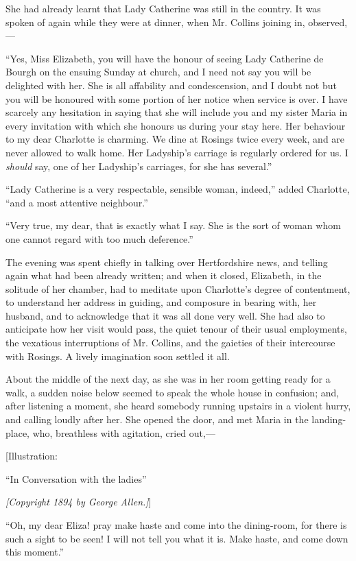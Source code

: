 \documentclass[12pt]{book}
\begin{document}
She had already learnt that Lady Catherine was still in the country. It was spoken of again while they were at dinner, when Mr. Collins joining in, observed,---

``Yes, Miss Elizabeth, you will have the honour of seeing Lady Catherine de Bourgh on the ensuing Sunday at church, and I need not say you will be delighted with her. She is all affability and condescension, and I doubt not but you will be honoured with some portion of her notice when service is over. I have scarcely any hesitation in saying that she will include you and my sister Maria in every invitation with which she honours us during your stay here. Her behaviour to my dear Charlotte is charming. We dine at Rosings twice every week, and are never allowed to walk home. Her Ladyship's carriage is regularly ordered for us. I \textit{should} say, one of her Ladyship's carriages, for she has several.''

``Lady Catherine is a very respectable, sensible woman, indeed,'' added Charlotte, ``and a most attentive neighbour.''

``Very true, my dear, that is exactly what I say. She is the sort of woman whom one cannot regard with too much deference.''

The evening was spent chiefly in talking over Hertfordshire news, and telling again what had been already written; and when it closed, Elizabeth, in the solitude of her chamber, had to meditate upon Charlotte's degree of contentment, to understand her address in guiding, and composure in bearing with, her husband, and to acknowledge that it was all done very well. She had also to anticipate how her visit would pass, the quiet tenour of their usual employments, the vexatious interruptions of Mr. Collins, and the gaieties of their intercourse with Rosings. A lively imagination soon settled it all.

About the middle of the next day, as she was in her room getting ready for a walk, a sudden noise below seemed to speak the whole house in confusion; and, after listening a moment, she heard somebody running upstairs in a violent hurry, and calling loudly after her. She opened the door, and met Maria in the landing-place, who, breathless with agitation, cried out,---

[Illustration:

``In Conversation with the ladies''

\emph{[Copyright 1894 by George Allen.]}]

``Oh, my dear Eliza! pray make haste and come into the dining-room, for there is such a sight to be seen! I will not tell you what it is. Make haste, and come down this moment.''
\end{document}
